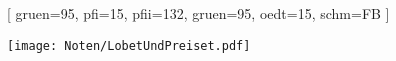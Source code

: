 [
    gruen={95}, 
    pfi={15}, 
    pfii={132},
    gruen={95}, 
    oedt={15},
    schm={FB}
]

\texttt{[image: Noten/LobetUndPreiset.pdf]}

\endsong
